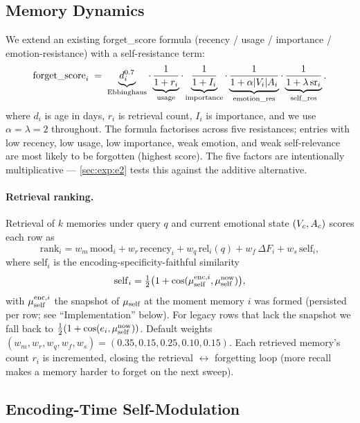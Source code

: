 \subsection{Memory Dynamics}

We extend an existing forget\_score formula (recency / usage /
importance / emotion-resistance) with a self-resistance term:
\begin{equation}
\label{eq:forget}
\text{forget\_score}_i \;=\;
\underbrace{d_i^{0.7}}_{\text{Ebbinghaus}}
\cdot
\underbrace{\frac{1}{1+r_i}}_{\text{usage}}
\cdot
\underbrace{\frac{1}{1+I_i}}_{\text{importance}}
\cdot
\underbrace{\frac{1}{1+\alpha|V_i|A_i}}_{\text{emotion\_res}}
\cdot
\underbrace{\frac{1}{1+\lambda\,\mathrm{sr}_i}}_{\text{self\_res}}.
\end{equation}
where $d_i$ is age in days, $r_i$ is retrieval count, $I_i$ is importance,
and we use $\alpha=\lambda=2$ throughout. The formula factorises across
five resistances; entries with low recency, low usage, low importance,
weak emotion, and weak self-relevance are most likely to be forgotten
(highest score). The five factors are intentionally multiplicative ---
\cref{sec:exp:e2} tests this against the additive alternative.

\paragraph{Retrieval ranking.}
Retrieval of $k$ memories under query $q$ and current emotional state
$(V_c,A_c)$ scores each row as
\begin{equation}
\label{eq:rank}
\text{rank}_i =
w_m\,\mathrm{mood}_i + w_r\,\mathrm{recency}_i + w_q\,\mathrm{rel}_i(q)
+ w_f\,\Delta F_i + w_s\,\mathrm{self}_i,
\end{equation}
where $\mathrm{self}_i$ is the encoding-specificity-faithful similarity
\[
\mathrm{self}_i = \tfrac{1}{2}\bigl(1 + \cos(\mu_{\text{self}}^{\text{enc},i}, \mu_{\text{self}}^{\text{now}})\bigr),
\]
with $\mu_{\text{self}}^{\text{enc},i}$ the snapshot of $\mu_{\text{self}}$ at the moment
memory $i$ was formed (persisted per row; see ``Implementation''
below). For legacy rows that lack the snapshot we fall back to
$\tfrac{1}{2}(1 + \cos(e_i, \mu_{\text{self}}^{\text{now}}))$. Default weights
$(w_m,w_r,w_q,w_f,w_s){=}(0.35,0.15,0.25,0.10,0.15)$. Each retrieved
memory's count $r_i$ is incremented, closing the retrieval
$\leftrightarrow$ forgetting loop (more recall makes a memory harder
to forget on the next sweep).

\subsection{Encoding-Time Self-Modulation}

